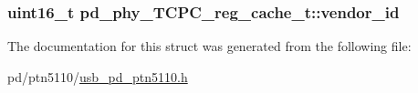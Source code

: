 \hypertarget{structpd__phy__TCPC__reg__cache__t_a7b91c3334783aadd61b12c07d39f1608}{
\subsubsection[{vendor\-\_\-id}]{\setlength{\rightskip}{0pt plus 5cm}uint16\-\_\-t pd\-\_\-phy\-\_\-\-T\-C\-P\-C\-\_\-reg\-\_\-cache\-\_\-t\-::vendor\-\_\-id}}\label{structpd__phy__TCPC__reg__cache__t_a7b91c3334783aadd61b12c07d39f1608}


The documentation for this struct was generated from the following file\-:\begin{DoxyCompactItemize}
\item 
pd/ptn5110/\hyperlink{usb__pd__ptn5110_8h}{usb\-\_\-pd\-\_\-ptn5110.\-h}\end{DoxyCompactItemize}

